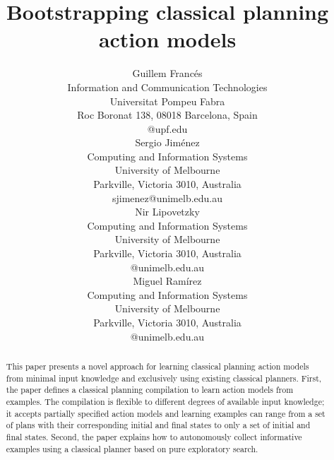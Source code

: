 \documentclass[letterpaper]{article} %
\begin{document}
\title{Bootstrapping classical planning action models}

\author{Guillem Franc\'es\\
{\small Information and Communication Technologies}\\
{\small Universitat Pompeu Fabra}\\
{\small Roc Boronat 138, 08018 Barcelona, Spain}\\
{\small @upf.edu}\\
\And Sergio Jim\'enez\\
{\small Computing and Information Systems}\\
{\small University of Melbourne}\\
{\small Parkville, Victoria 3010, Australia}\\
{\small sjimenez@unimelb.edu.au}\\
\And Nir Lipovetzky\\
{\small Computing and Information Systems}\\
{\small University of Melbourne}\\
{\small Parkville, Victoria 3010, Australia}\\
{\small @unimelb.edu.au}\\
\And Miguel Ram\'irez\\
{\small Computing and Information Systems}\\
{\small University of Melbourne}\\
{\small Parkville, Victoria 3010, Australia}\\
{\small @unimelb.edu.au}\\
}
 
\maketitle
\begin{abstract}
This paper presents a novel approach for learning classical planning action models from minimal input knowledge and exclusively using existing classical planners. First, the paper defines a classical planning compilation to learn action models from examples. The compilation is flexible to different degrees of available input knowledge; it accepts partially specified action models and learning examples can range from a set of plans with their corresponding initial and final states to only a set of initial and final states. Second, the paper explains how to autonomously collect informative examples using a classical planner based on pure exploratory search. 
\end{abstract}
\end{document}
